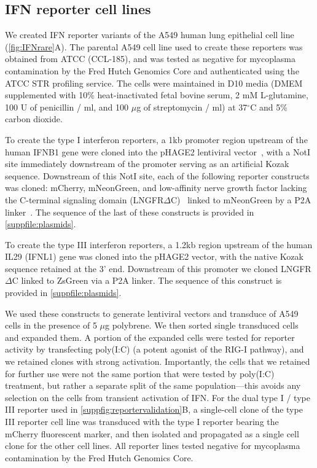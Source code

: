 \documentclass[10pt,letterpaper]{article}
\newcommand{\FIG}[1]{\autoref{fig:#1}}
\newcommand{\SUPPFILE}[1]{\autoref{suppfile:#1}}
\newcommand{\SUPPFIG}[1]{\autoref{suppfig:#1}}
\begin{document}
\subsection*{IFN reporter cell lines}
We created IFN reporter variants of the A549 human lung epithelial cell line (\FIG{IFNrare}A).
The parental A549 cell line used to create these reporters was obtained from ATCC (CCL-185), and was tested as negative for mycoplasma contamination by the Fred Hutch Genomics Core and authenticated using the ATCC STR profiling service.
The cells were maintained in D10 media (DMEM supplemented with 10\% heat-inactivated fetal bovine serum, 2 mM L-glutamine, 100 U of penicillin / ml, and 100 $\mu$g of streptomycin / ml) at 37$^{\circ}$C and 5\% carbon dioxide.

To create the type I interferon reporters, a 1kb promoter region upstream of the human IFNB1 gene were cloned into the pHAGE2 lentiviral vector~\citep{oconnell2010lentiviral}, with a NotI site immediately downstream of the promoter serving as an artificial Kozak sequence. 
Downstream of this NotI site, each of the following reporter constructs was cloned: mCherry, mNeonGreen, and low-affinity nerve growth factor lacking the C-terminal signaling domain (LNGFR$\Delta$C)~\citep{bonini1997hsv,ruggieri1997cell} linked to mNeonGreen by a P2A linker~\citep{kim2011high}.
The sequence of the last of these constructs is provided in \SUPPFILE{plasmids}.

To create the type III interferon reporters, a 1.2kb region upstream of the human IL29 (IFNL1) gene was cloned into the pHAGE2 vector, with the native Kozak sequence retained at the 3' end. 
Downstream of this promoter we cloned LNGFR$\Delta$C linked to ZsGreen via a P2A linker.
The sequence of this construct is provided in \SUPPFILE{plasmids}.
 
We used these constructs to generate lentiviral vectors and transduce of A549 cells in the presence of 5 $\mu$g polybrene.
We then sorted single transduced cells and expanded them.
A portion of the expanded cells were tested for reporter activity by transfecting poly(I:C) (a potent agonist of the RIG-I pathway), and we retained clones with strong activation.
Importantly, the cells that we retained for further use were not the same portion that were tested by poly(I:C) treatment, but rather a separate split of the same population---this avoids any selection on the cells from transient activation of IFN.
For the dual type I / type III reporter used in \SUPPFIG{reportervalidation}B, a single-cell clone of the type III reporter cell line was transduced with the type I reporter bearing the mCherry fluorescent marker, and then isolated and propagated as a single cell clone for the other cell lines.
All reporter lines tested negative for mycoplasma contamination by the Fred Hutch Genomics Core.
\end{document}
